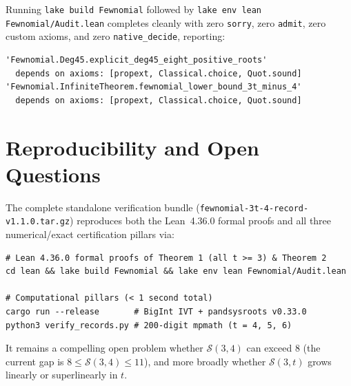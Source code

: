 \documentclass[11pt,a4paper]{amsart}
\theoremstyle{remark}
\newcommand{\Sfn}{\mathcal{S}}
\begin{document}
Running \texttt{lake build Fewnomial} followed by \texttt{lake env lean Fewnomial/Audit.lean} completes cleanly with zero \texttt{sorry}, zero \texttt{admit}, zero custom axioms, and zero \texttt{native\_decide}, reporting:
\begin{verbatim}
'Fewnomial.Deg45.explicit_deg45_eight_positive_roots'
  depends on axioms: [propext, Classical.choice, Quot.sound]
'Fewnomial.InfiniteTheorem.fewnomial_lower_bound_3t_minus_4'
  depends on axioms: [propext, Classical.choice, Quot.sound]
\end{verbatim}

\section{Reproducibility and Open Questions}

The complete standalone verification bundle (\texttt{fewnomial-3t-4-record-v1.1.0.tar.gz}) reproduces both the Lean~4.36.0 formal proofs and all three numerical/exact certification pillars via:
\begin{verbatim}
# Lean 4.36.0 formal proofs of Theorem 1 (all t >= 3) & Theorem 2
cd lean && lake build Fewnomial && lake env lean Fewnomial/Audit.lean

# Computational pillars (< 1 second total)
cargo run --release       # BigInt IVT + pandsysroots v0.33.0
python3 verify_records.py # 200-digit mpmath (t = 4, 5, 6)
\end{verbatim}

It remains a compelling open problem whether $\Sfn(3, 4)$ can exceed $8$ (the current gap is $8 \le \Sfn(3, 4) \le 11$), and more broadly whether $\Sfn(3, t)$ grows linearly or superlinearly in $t$.
\end{document}
